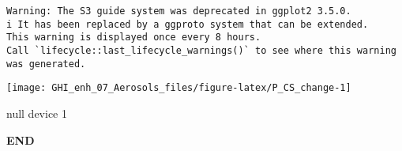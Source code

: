 \documentclass[
  10pt,
  a4paper,oneside]{article}
\begin{document}
\begin{verbatim}
Warning: The S3 guide system was deprecated in ggplot2 3.5.0.
i It has been replaced by a ggproto system that can be extended.
This warning is displayed once every 8 hours.
Call `lifecycle::last_lifecycle_warnings()` to see where this warning was generated.
\end{verbatim}

\begin{center}\texttt{[image: GHI\_enh\_07\_Aerosols\_files/figure-latex/P\_CS\_change-1]} \end{center}

null device
1

\textbf{END}
\end{document}
